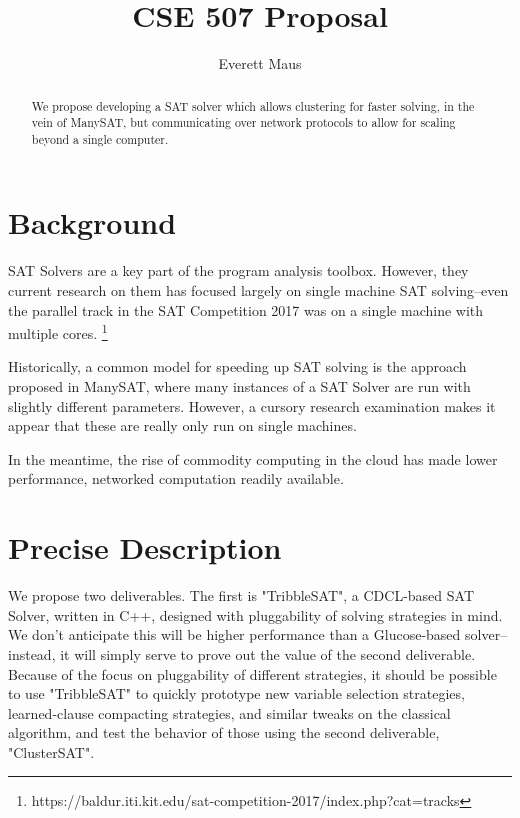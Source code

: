 \documentclass[10pt]{article}
\title{CSE 507 Proposal}
\author{Everett Maus}
\begin{document}
\maketitle

\begin{abstract}
  We propose developing a SAT solver which allows clustering for faster solving, in the 
  vein of ManySAT, but communicating over network protocols to allow for scaling beyond
  a single computer.
\end{abstract}

\section{Background}
SAT Solvers are a key part of the program analysis toolbox.  However, they current research on
  them has focused largely on single machine SAT solving--even the parallel track in the SAT 
  Competition 2017 was on a single machine with multiple cores. \footnote{https://baldur.iti.kit.edu/sat-competition-2017/index.php?cat=tracks}

  Historically, a common model for speeding up SAT solving is the approach proposed in ManySAT,
  where many instances of a SAT Solver are run with slightly different parameters.  However,
  a cursory research examination makes it appear that these are really only run on single machines.

  In the meantime, the rise of commodity computing in the cloud has made lower performance, networked
  computation readily available.

\section{Precise Description}

  We propose two deliverables.  The first is "TribbleSAT", a CDCL-based SAT Solver, 
  written in C++, designed with pluggability of solving strategies in mind.  We don't anticipate
  this will be higher performance than a Glucose-based solver--instead, it will simply serve to
  prove out the value of the second deliverable.  Because of the focus on pluggability of different
  strategies, it should be possible to use "TribbleSAT" to quickly prototype new variable
  selection strategies, learned-clause compacting strategies, and similar tweaks on the classical
  algorithm, and test the behavior of those using the second deliverable, "ClusterSAT".
\end{document}
